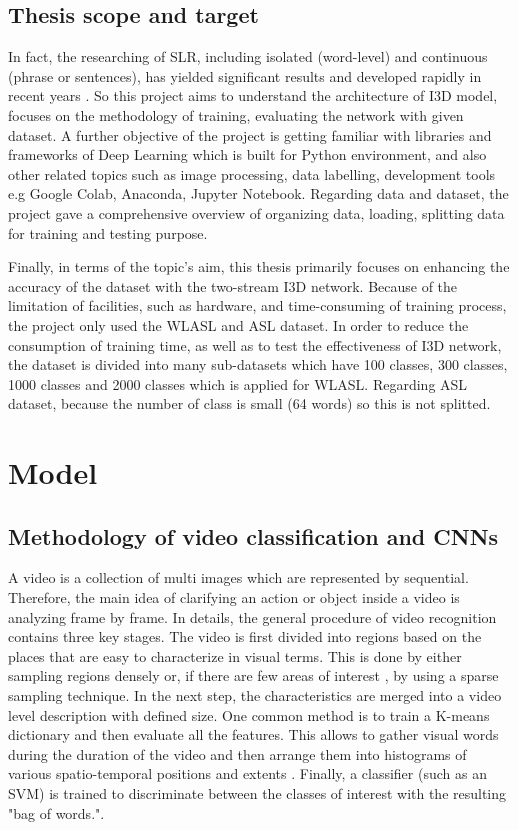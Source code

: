 \documentclass[a4paper, 12pt]{article}
\begin{document}
\subsection{Thesis scope and target}
In fact, the researching of SLR, including isolated (word-level) and continuous (phrase or sentences), has yielded significant results and developed rapidly in recent years .
So this project aims to understand the architecture of I3D model, focuses on the methodology of training, evaluating the network with given dataset. A further objective of the project is getting familiar with libraries and frameworks of Deep Learning which is built for Python environment, and also other related topics such as image processing, data labelling, development tools e.g Google Colab, Anaconda, Jupyter Notebook.
Regarding data and dataset, the project gave a comprehensive overview of organizing data, loading, splitting data for training and testing purpose.

Finally, in terms of the topic's aim, this thesis primarily focuses on enhancing the accuracy of the dataset with the two-stream I3D network. Because of the limitation of facilities, such as hardware, and time-consuming of training process, the project only used the WLASL and ASL dataset. 
In order to reduce the consumption of training time, as well as to test the effectiveness of I3D network, the dataset is divided into many sub-datasets which have 100 classes, 300 classes, 1000 classes and 2000 classes which is applied for WLASL. Regarding ASL dataset, because the number of class is small (64 words) so this is not splitted.

\section{Model}
\subsection{Methodology of video classification and CNNs}
A video is a collection of multi images which are represented by sequential. Therefore, the main idea of clarifying an action or object inside a video is analyzing frame by frame. In details, the general procedure of video recognition \citep{sivic2003video,niebles2010modeling} contains three key stages. 
The video is first divided into regions \citep{liu2009recognizing} based on the places that are easy to characterize in visual terms. This is done by either sampling regions densely \citep{wang2013action} or, if there are few areas of interest \citep{laptev2005space}, by using a sparse sampling technique. 
In the next step, the characteristics are merged into a video level description with defined size. One common method is to train a K-means dictionary and then evaluate all the features. This allows to gather visual words during the duration of the video and then arrange them into histograms of various spatio-temporal positions and extents \citep{karpathy2014large,laptev2008learning}.
Finally, a classifier (such as an SVM) is trained to discriminate between the classes of interest with the resulting "bag of words.".
\end{document}
